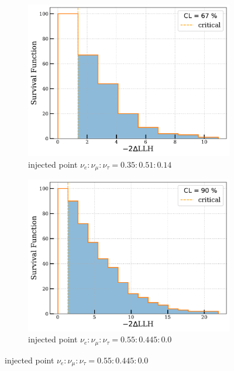 \begin{figure}[hbt!]

\begin{subfigure}{.7\textwidth}
    \includegraphics[width=\linewidth]{./figures/results/67_distribution.pdf}
    \caption{injected point $\nu_e:\nu_{\mu}:\nu_{\tau} = 0.35:0.51:0.14$}
\end{subfigure}\hfill %
\begin{subfigure}{.7\textwidth}
    \includegraphics[width=\linewidth]{./figures/results/90_distribution.pdf}
    \caption{injected point $\nu_e:\nu_{\mu}:\nu_{\tau} = 0.55:0.445:0.0$}
\end{subfigure}


\end{figure}
